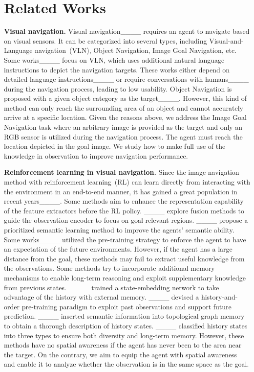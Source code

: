\section{Related Works}
\textbf{Visual navigation.} Visual navigation____ requires an agent to navigate based on visual sensors. It can be categorized into several types, including Visual-and-Language navigation~(VLN), Object Navigation, Image Goal Navigation, etc. Some works____ focus on VLN, which uses additional natural language instructions to depict the navigation targets. These works either depend on detailed language instructions____ or require conversations with humans____ during the navigation process, leading to low usability. 
Object Navigation is proposed with a given object category as the target____. However, this kind of method can only reach the surrounding area of an object and cannot accurately arrive at a specific location.
Given the reasons above, we address the Image Goal Navigation task where an arbitrary image is provided as the target and only an RGB sensor is utilized during the navigation process. The agent must reach the location depicted in the goal image. We study how to make full use of the knowledge in observation to improve navigation performance.

\noindent\textbf{Reinforcement learning in visual navigation.} Since the image navigation method with reinforcement learning~(RL) can learn directly from interacting with the environment in an end-to-end manner, it has gained a great population in recent years____. Some methods aim to enhance the representation capability of the feature extractors before the RL policy. ____ explore fusion methods to guide the observation encoder to focus on goal-relevant regions. ____ propose a prioritized semantic learning method to improve the agents' semantic ability. Some works____ utilized the pre-training strategy to enforce the agent to have an expectation of the future environments. 
However, if the agent has a large distance from the goal, these methods may fail to extract useful knowledge from the observations. 
Some methods try to incorporate additional memory mechanisms to enable long-term reasoning and exploit supplementary knowledge from previous states. ____ trained a state-embedding network to take advantage of the history with external memory. ____ devised a history-and-order pre-training paradigm to exploit past observations and support future prediction. ____ inserted semantic information into topological graph memory to obtain a thorough description of history states. ____ classified history states into three types to ensure both diversity and long-term memory. However, these methods have no spatial awareness if the agent has never been to the area near the target. On the contrary, we aim to equip the agent with spatial awareness and enable it to analyze whether the observation is in the same space as the goal.

